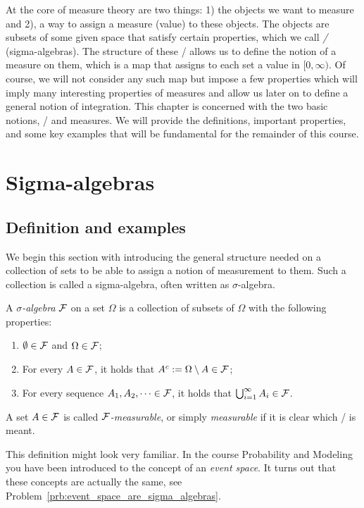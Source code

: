 At the core of measure theory are two things: 1) the objects we want to measure and 2), a way to assign a measure (value) to these objects. The objects are subsets of some given space that satisfy certain properties, which we call \emph{\sigalgs/} (sigma-algebras). The structure of these \sigalgs/ allows us to define the notion of a measure on them, which is a map that assigns to each set a value in $[0,\infty)$. Of course, we will not consider any such map but impose a few properties which will imply many interesting properties of measures and allow us later on to define a general notion of integration. This chapter is concerned with the two basic notions, \sigalgs/ and measures. We will provide the definitions, important properties, and some key examples that will be fundamental for the remainder of this course.

\section{Sigma-algebras}

\subsection{Definition and examples}

We begin this section with introducing the general structure needed on a collection of sets to be able to assign a notion of measurement to them. Such a collection is called a sigma-algebra, often written as $\sigma$-algebra.

\begin{definition}\label{def:sigma_algebra}
A \emph{$\sigma$-algebra} $\mathcal F$ on a set $\Omega$ is a collection of subsets of $\Omega$ with the following properties:
\begin{enumerate}
\item $\emptyset \in \mathcal F$ and $\Omega \in \mathcal F$;
\item For every $A \in \mathcal F$, it holds that $A^c := \Omega \setminus A \in \mathcal F$;
\item For every sequence $A_1, A_2, \dots \in \mathcal F$, it holds that $\bigcup_{i = 1}^\infty A_i \in \mathcal F$.
\end{enumerate}
A set $A \in \mathcal F$ is called \emph{$\mathcal F$-measurable}, or simply \emph{measurable} if it is clear which \sigalg/ is meant.
\end{definition}

This definition might look very familiar. In the course Probability and Modeling you have been introduced to the concept of an \emph{event space}. It turns out that these concepts are actually the same, see Problem~\ref{prb:event_space_are_sigma_algebras}.

